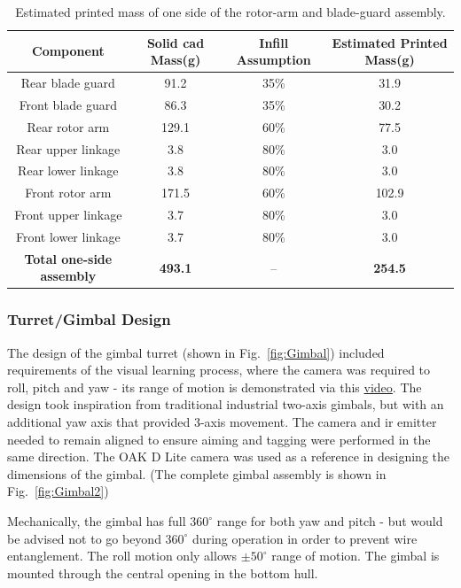 \documentclass{report_template_oxford}
\begin{document}
\begin{table}[htbp]
\centering
\caption{Estimated printed mass of one side of the rotor-arm and blade-guard assembly.}
\label{tab:rotor_arm_mass_estimate}
\renewcommand{\arraystretch}{1.15}
\begin{tabular}{|c|c|c|c|}
\toprule
\textbf{Component} & \textbf{Solid \gls{cad} Mass(g)} & \textbf{Infill Assumption} & \textbf{Estimated Printed Mass(g)} \\
\hline
Rear blade guard & 91.2 & 35\% & 31.9 \\
Front blade guard & 86.3 & 35\% & 30.2 \\
Rear rotor arm & 129.1 & 60\% & 77.5 \\
Rear upper linkage & 3.8 & 80\% & 3.0 \\
Rear lower linkage & 3.8 & 80\% & 3.0 \\
Front rotor arm & 171.5 & 60\% & 102.9 \\
Front upper linkage & 3.7 & 80\% & 3.0 \\
Front lower linkage & 3.7 & 80\% & 3.0 \\
\hline
\textbf{Total one-side assembly} & \textbf{493.1} & -- & \textbf{254.5} \\
\hline
\end{tabular}
\end{table}

\subsubsection{Turret/Gimbal Design}
\label{Turret}
The design of the gimbal turret (shown in Fig.~\ref{fig:Gimbal}) included requirements of the visual learning process, where the camera was required to roll, pitch and yaw - its range of motion is demonstrated via this \href{https://drive.google.com/file/d/16lPV_-VS57LZUX7-dhvgIS6Q2sYhDQis/view?usp=sharing}{video}. The design took inspiration from traditional industrial two-axis gimbals, but with an additional yaw axis that provided 3-axis movement. The camera and \gls{ir} emitter needed to remain aligned to ensure aiming and tagging were performed in the same direction. The OAK D Lite camera was used as a reference in designing the dimensions of the gimbal. (The complete gimbal assembly is shown in Fig.~\ref{fig:Gimbal2})

Mechanically, the gimbal has full $360^{\circ}$ range for both yaw and pitch - but would be advised not to go beyond $360^{\circ}$ during operation in order to prevent wire entanglement. The roll motion only allows $\pm50^{\circ}$ range of motion. The gimbal is mounted through the central opening in the bottom hull. 
\end{document}
